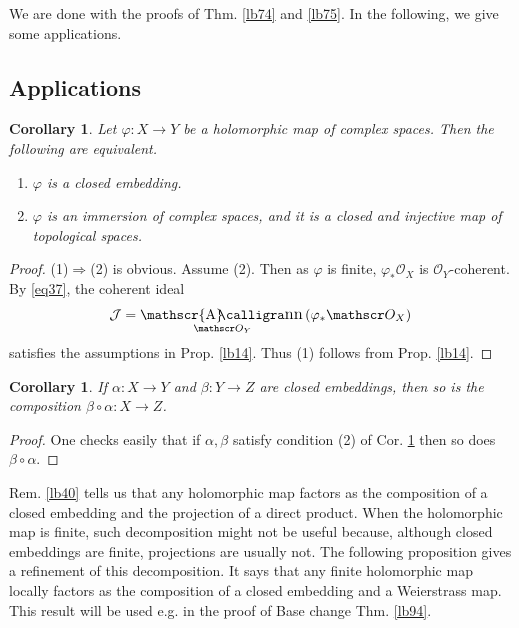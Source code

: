 \documentclass[12pt,b5paper,notitlepage]{report}
\theoremstyle{definition}
\theoremstyle{plain}
\newtheorem{co}[df]{Corollary}
\DeclareMathOperator{\sann}{\mathscr{A}\text{\kern -3pt {\calligra\large nn}}\,}
\newcommand{\mc}{\mathcal}
\newcommand{\scr}{\mathscr}
\numberwithin{equation}{section}
\begin{document}
We are done with the proofs of Thm. \ref{lb74} and \ref{lb75}. In the following, we give some applications.


\subsection{Applications}


\begin{co}\label{lb84}
Let $\varphi:X\rightarrow Y$ be a holomorphic map of complex spaces. Then the following are equivalent.
\begin{enumerate}[label=(\arabic*)]
\item $\varphi$ is a closed embedding.
\item $\varphi$ is an immersion of complex spaces, and it is a closed and injective map of topological spaces.
\end{enumerate}
\end{co}

\begin{proof}
(1)$\Rightarrow$(2) is obvious. Assume (2). Then as $\varphi$ is finite, $\varphi_*\scr O_X$ is $\scr O_Y$-coherent. By \eqref{eq37}, the coherent ideal
\begin{align*}
\mc J=\sann_{\scr O_Y}(\varphi_*\scr O_X)
\end{align*}
satisfies the assumptions in Prop. \ref{lb14}. Thus (1) follows from Prop. \ref{lb14}.
\end{proof}


\begin{co}\label{lb81}
If $\alpha:X\rightarrow Y$ and $\beta:Y\rightarrow Z$ are closed embeddings, then so is the composition $\beta\circ\alpha:X\rightarrow Z$.
\end{co}

\begin{proof}
One checks easily that if $\alpha,\beta$ satisfy condition (2) of Cor. \ref{lb84} then so does $\beta\circ\alpha$.
\end{proof}


Rem. \ref{lb40} tells us that any holomorphic map factors as the composition of a closed embedding and the projection of a direct product. When the holomorphic map is finite, such decomposition might not be useful because, although closed embeddings are finite, projections are usually not. The following proposition gives a refinement of this decomposition. It says that any finite holomorphic map locally factors as the composition of a closed embedding and a Weierstrass map. This result will be used e.g. in the proof of Base change Thm. \ref{lb94}.
\end{document}
